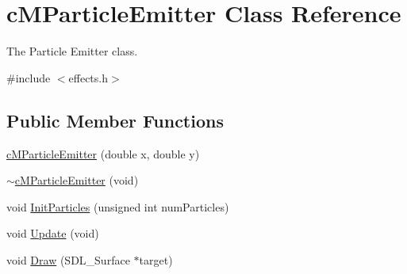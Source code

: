 \hypertarget{classc_m_particle_emitter}{\section{c\-M\-Particle\-Emitter Class Reference}
\label{classc_m_particle_emitter}
}


The Particle Emitter class.  




{\ttfamily \#include $<$effects.\-h$>$}

\subsection*{Public Member Functions}
\begin{DoxyCompactItemize}
\item 
\hyperlink{classc_m_particle_emitter_aa2375ca62035b79b5f0cd56b89e0fc6c}{c\-M\-Particle\-Emitter} (double x, double y)
\item 
\hyperlink{classc_m_particle_emitter_a93161bf387bddadae17ce5aedbbdd593}{$\sim$c\-M\-Particle\-Emitter} (void)
\item 
void \hyperlink{classc_m_particle_emitter_ac766da0ffb80ce34aecf980341b65ee4}{Init\-Particles} (unsigned int num\-Particles)
\item 
void \hyperlink{classc_m_particle_emitter_a532c3cedb373d1a74a9811f271892ab7}{Update} (void)
\item 
void \hyperlink{classc_m_particle_emitter_a99346f13866abcba6bc2907957d5c56e}{Draw} (S\-D\-L\-\_\-\-Surface $\ast$target)
\end{DoxyCompactItemize}
